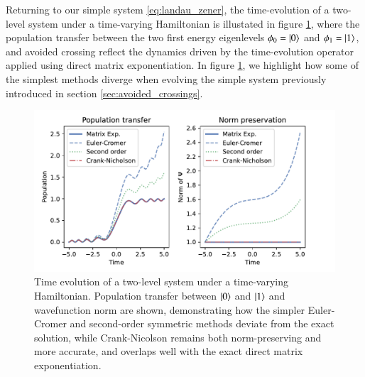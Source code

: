 \documentclass{subfiles}
\begin{document}
Returning to our simple system \eqref{eq:landau_zener}, the time-evolution of a two-level system under a time-varying Hamiltonian is illustated in figure \ref{fig:landau_zener}, where the population transfer between the two first energy eigenlevels $\phi_0 = \ket{0}$ and $\phi_1=\ket{1}$, and avoided crossing reflect the dynamics driven by the time-evolution operator applied using direct matrix exponentiation. In figure \ref{fig:landau_zener}, we highlight how some of the simplest methods diverge when evolving the simple system previously introduced in section \ref{sec:avoided_crossings}.
\begin{figure}[h!]
    \centering
    \includegraphics[width=1.0\textwidth]{figs/landau_zener_numerical_methods.pdf}
    \caption{Time evolution of a two-level system under a time-varying Hamiltonian. Population transfer between $\ket{0}$ and $\ket{1}$ and wavefunction norm are shown, demonstrating how the simpler Euler-Cromer and second-order symmetric methods deviate from the exact solution, while Crank-Nicolson remains both norm-preserving and more accurate, and overlaps well with the exact direct matrix exponentiation.}\label{fig:landau_zener}
\end{figure}
\end{document}
